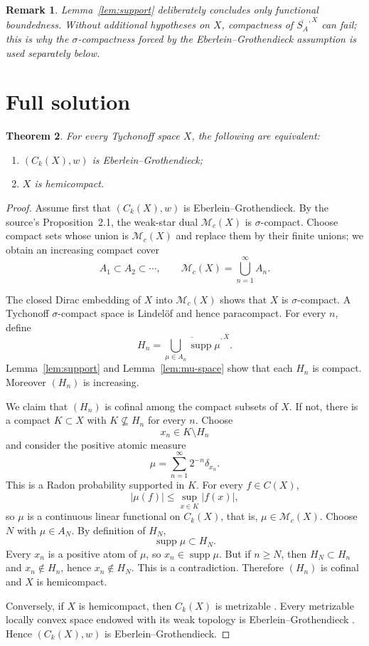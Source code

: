 \documentclass[11pt]{article}
\newtheorem{theorem}{Theorem}
\newtheorem{remark}[theorem]{Remark}
\newcommand{\supp}{\operatorname{supp}}
\newcommand{\Mc}{\mathcal M_c}
\begin{document}
\begin{remark}
Lemma~\ref{lem:support} deliberately concludes only functional boundedness.
Without additional hypotheses on $X$, compactness of
$\overline{S_A}^{,X}$ can fail; this is why the $\sigma$-compactness forced
by the Eberlein--Grothendieck assumption is used separately below.
\end{remark}

\section{Full solution}

\begin{theorem}\label{thm:main}
For every Tychonoff space $X$, the following are equivalent:
\begin{enumerate}
\item $(C_k(X),w)$ is Eberlein--Grothendieck;
\item $X$ is hemicompact.
\end{enumerate}
\end{theorem}

\begin{proof}
Assume first that $(C_k(X),w)$ is Eberlein--Grothendieck.  By the source's
Proposition~2.1, the weak-star dual $\Mc(X)$ is $\sigma$-compact.  Choose
compact sets whose union is $\Mc(X)$ and replace them by their finite unions;
we obtain an increasing compact cover
\[
 A_1\subset A_2\subset\cdots,\qquad \Mc(X)=\bigcup_{n=1}^{\infty}A_n.
\]

The closed Dirac embedding of $X$ into $\Mc(X)$ shows that $X$ is
$\sigma$-compact.  A Tychonoff $\sigma$-compact space is Lindel\"of and hence
paracompact.  For every $n$, define
\[
 H_n=\overline{\bigcup_{\mu\in A_n}\supp\mu}^{,X}.
\]
Lemma~\ref{lem:support} and Lemma~\ref{lem:mu-space} show that each $H_n$ is
compact.  Moreover $(H_n)$ is increasing.

We claim that $(H_n)$ is cofinal among the compact subsets of $X$.  If not,
there is a compact $K\subset X$ with $K\nsubseteq H_n$ for every $n$.  Choose
\[
 x_n\in K\setminus H_n
\]
and consider the positive atomic measure
\[
 \mu=\sum_{n=1}^{\infty}2^{-n}\delta_{x_n}.
\]
This is a Radon probability supported in $K$.  For every $f\in C(X)$,
\[
 |\mu(f)|\leq \sup_{x\in K}|f(x)|,
\]
so $\mu$ is a continuous linear functional on $C_k(X)$, that is,
$\mu\in\Mc(X)$.  Choose $N$ with $\mu\in A_N$.  By definition of $H_N$,
\[
 \supp\mu\subset H_N.
\]
Every $x_n$ is a positive atom of $\mu$, so $x_n\in\supp\mu$.  But if
$n\geq N$, then $H_N\subset H_n$ and $x_n\notin H_n$, hence
$x_n\notin H_N$.  This is a contradiction.  Therefore $(H_n)$ is cofinal and
$X$ is hemicompact.

Conversely, if $X$ is hemicompact, then $C_k(X)$ is metrizable
\cite[Theorem~5.8.5]{narici}.  Every metrizable locally convex space endowed
with its weak topology is Eberlein--Grothendieck
\cite[Corollary~2.3]{source}.  Hence $(C_k(X),w)$ is
Eberlein--Grothendieck.
\end{proof}
\end{document}

